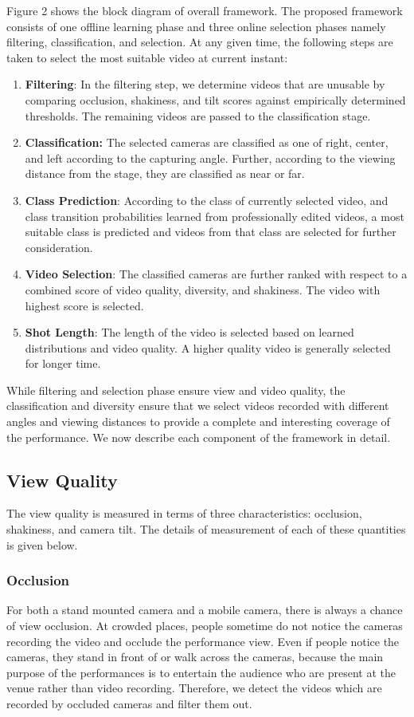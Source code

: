 \documentclass{new}
\begin{document}
 Figure 2 shows the block diagram of overall framework. The proposed framework consists of one offline learning phase and three online selection phases namely filtering, classification, and selection. At any given time, the following steps are taken to select the most suitable video at current instant:
\begin{enumerate}
  \item \textbf{Filtering}: In the filtering step, we determine videos that are
unusable by comparing occlusion, shakiness, and tilt scores
against empirically determined thresholds. The remaining
videos are passed to the classification stage.
  \item \textbf{Classification:} The selected cameras are classified as one
of right, center, and left according to the capturing angle.
Further, according to the viewing distance from the stage,
they are classified as near or far.
 \item \textbf{Class Prediction}: According to the class of currently selected
video, and class transition probabilities learned from
professionally edited videos, a most suitable class is predicted
and videos from that class are selected for further consideration.
\item \textbf{Video Selection}: The classified cameras are further ranked
with respect to a combined score of video quality, diversity,
and shakiness. The video with highest score is selected.
\item \textbf{Shot Length}: The length of the video is selected based on
learned distributions and video quality. A higher quality video
is generally selected for longer time.
\end{enumerate}

While filtering and selection phase ensure view and video quality,
the classification and diversity ensure that we select videos
recorded with different angles and viewing distances to provide a
complete and interesting coverage of the performance. We now
describe each component of the framework in detail.

\subsection{View Quality}
The view quality is measured in terms of three characteristics:
occlusion, shakiness, and camera tilt. The details of measurement
of each of these quantities is given below.
\subsubsection{Occlusion}
For both a stand mounted camera and a mobile camera, there
is always a chance of view occlusion. At crowded places, people
sometime do not notice the cameras recording the video and occlude
the performance view. Even if people notice the cameras,
they stand in front of or walk across the cameras, because the main
purpose of the performances is to entertain the audience who are
present at the venue rather than video recording. Therefore, we detect
the videos which are recorded by occluded cameras and filter
them out.
\end{document}
